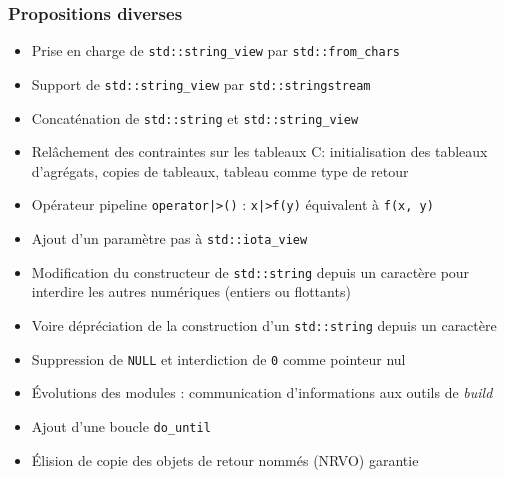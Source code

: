 \documentclass[C++.tex]{subfiles}
\begin{document}
\begin{frame}[fragile]
	\frametitle{Propositions diverses}
	\begin{itemize}
		\item Prise en charge de \lstinline|std::string_view| par \lstinline|std::from_chars|
		\item Support de \lstinline|std::string_view| par \lstinline|std::stringstream|
		\item Concaténation de \lstinline|std::string| et \lstinline|std::string_view|
		\item Relâchement des contraintes sur les tableaux \og C\fg{}: initialisation des tableaux d'agrégats, copies de tableaux, tableau comme type de retour


		\item Opérateur pipeline \lstinline!operator|>()! :  \lstinline!x|>f(y)! équivalent à \lstinline|f(x, y)|
		\item Ajout d'un paramètre \og pas\fg{} à \lstinline|std::iota_view|
		\item Modification du constructeur de \lstinline|std::string| depuis un caractère pour interdire les autres numériques (entiers ou flottants)


		\item Voire dépréciation de la construction d'un \lstinline|std::string| depuis un caractère
		\item Suppression de \lstinline|NULL| et interdiction de \lstinline|0| comme pointeur nul
		\item Évolutions des modules : communication d'informations aux outils de \textit{build}
		\item Ajout d'une boucle \lstinline|do_until|
		\item Élision de copie des objets de retour nommés (NRVO) garantie


	\end{itemize}
\end{frame}
\end{document}
